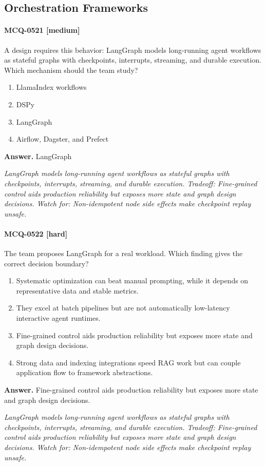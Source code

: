 \subsection{Orchestration Frameworks}
\paragraph{MCQ-0521 [medium]} A design requires this behavior: LangGraph models long-running agent workflows as stateful graphs with checkpoints, interrupts, streaming, and durable execution. Which mechanism should the team study?
\begin{enumerate}[label=\Alph*.]
\item LlamaIndex workflows
\item DSPy
\item LangGraph
\item Airflow, Dagster, and Prefect
\end{enumerate}
\noindent\textbf{Answer.} LangGraph
\par\textit{LangGraph models long-running agent workflows as stateful graphs with checkpoints, interrupts, streaming, and durable execution. Tradeoff: Fine-grained control aids production reliability but exposes more state and graph design decisions. Watch for: Non-idempotent node side effects make checkpoint replay unsafe.}
\paragraph{MCQ-0522 [hard]} The team proposes LangGraph for a real workload. Which finding gives the correct decision boundary?
\begin{enumerate}[label=\Alph*.]
\item Systematic optimization can beat manual prompting, while it depends on representative data and stable metrics.
\item They excel at batch pipelines but are not automatically low-latency interactive agent runtimes.
\item Fine-grained control aids production reliability but exposes more state and graph design decisions.
\item Strong data and indexing integrations speed RAG work but can couple application flow to framework abstractions.
\end{enumerate}
\noindent\textbf{Answer.} Fine-grained control aids production reliability but exposes more state and graph design decisions.
\par\textit{LangGraph models long-running agent workflows as stateful graphs with checkpoints, interrupts, streaming, and durable execution. Tradeoff: Fine-grained control aids production reliability but exposes more state and graph design decisions. Watch for: Non-idempotent node side effects make checkpoint replay unsafe.}
